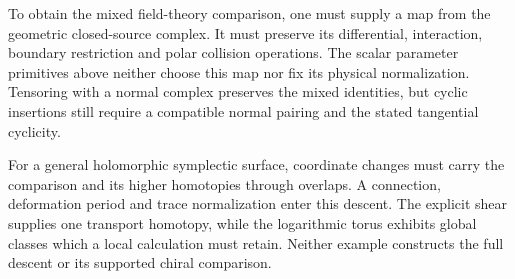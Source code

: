 To obtain the mixed field-theory comparison, one must supply
a map from the geometric closed-source complex. It must
preserve its differential, interaction, boundary restriction
and polar collision operations. The scalar parameter
primitives above neither choose this map nor fix its physical
normalization. Tensoring with a normal complex preserves the
mixed identities, but cyclic insertions still require a
compatible normal pairing and the stated tangential cyclicity.

For a general holomorphic symplectic surface, coordinate
changes must carry the comparison and its higher homotopies
through overlaps. A connection, deformation period and trace
normalization enter this descent. The explicit shear supplies
one transport homotopy, while the logarithmic torus exhibits
global classes which a local calculation must retain.
Neither example constructs the full descent or its supported
chiral comparison.
